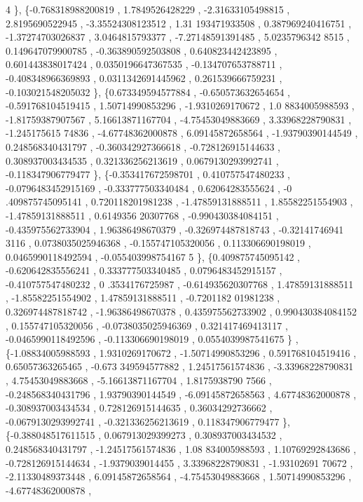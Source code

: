 \begin{DoxyCode}
      4 \},
\{-0.768318988200819 ,   1.7849526428229 , -2.31633105498815 ,   2.8195690522945 , -3.35524308123512 ,  1.31
      193471933508 , 0.387969240416751 , -1.37274703026837 ,   3.0464815793377 , -7.27148591391485 ,  5.0235796342
      8515 , 0.149647079900785 , -0.363890592503808 , 0.640823442423895 , 0.601443838017424 , 0.0350196647367535 ,
       -0.134707653788711 , -0.408348966369893 , 0.0311342691445962 , 0.261539666759231 , -0.103021548205032 \},
\{0.673349594577884 , -0.650573632654654 , -0.591768104519415 ,  1.50714990853296 ,  -1.9310269170672 ,  1.0
      8834005988593 , -1.81759387907567 ,  5.16613871167704 , -4.75453049883669 ,  3.33968228790831 , -1.245175615
      74836 , -4.67748362000878 ,  6.09145872658564 , -1.93790390144549 , 0.248568340431797 , -0.360342927366618 ,
       -0.728126915144633 , 0.308937003434535 , 0.321336256213619 , 0.0679130293992741 , -0.118347906779477 \},
\{-0.353417672598701 , 0.410757547480233 , -0.0796483452915169 , -0.333777503340484 ,  0.62064283555624 , -0
      .409875745095141 , 0.720118201981238 , -1.47859131888511 ,  1.85582251554903 , -1.47859131888511 , 0.6149356
      20307768 , -0.990430384084151 , -0.435975562733904 ,  1.96386498670379 , -0.326974487818743 , -0.32141746941
      3116 , 0.0738035025946368 , -0.155747105320056 , 0.113306690198019 , 0.0465990118492594 , -0.055403998754167
      5 \},
\{0.409875745095142 , -0.620642835556241 , 0.333777503340485 , 0.0796483452915157 , -0.410757547480232 ,   0
      .3534176725987 , -0.614935620307768 ,  1.47859131888511 , -1.85582251554902 ,  1.47859131888511 , -0.7201182
      01981238 , 0.326974487818742 , -1.96386498670378 , 0.435975562733902 , 0.990430384084152 , 0.155747105320056
       , -0.0738035025946369 , 0.321417469413117 , -0.0465990118492596 , -0.113306690198019 , 0.0554039987541675 \}
      ,
\{-1.08834005988593 ,   1.9310269170672 , -1.50714990853296 , 0.591768104519416 ,  0.65057363265465 , -0.673
      349594577882 ,  1.24517561574836 , -3.33968228790831 ,  4.75453049883668 , -5.16613871167704 ,  1.8175938790
      7566 , -0.248568340431796 ,  1.93790390144549 , -6.09145872658563 ,  4.67748362000878 , -0.308937003434534 ,
       0.728126915144635 ,  0.36034292736662 , -0.0679130293992741 , -0.321336256213619 , 0.118347906779477 \},
\{-0.388048517611515 , 0.067913029399273 , 0.308937003434532 , 0.248568340431797 , -1.24517561574836 ,  1.08
      834005988593 ,  1.10769292843686 , -0.728126915144634 ,  -1.9379039014455 ,  3.33968228790831 ,  -1.93102691
      70672 , -2.11330489373448 ,  6.09145872658564 , -4.75453049883668 ,  1.50714990853296 , -4.67748362000878 , 

\end{DoxyCode}
